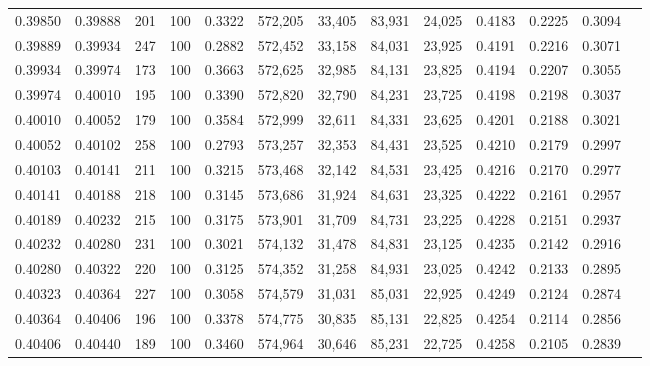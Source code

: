 \begin{tabular}{rrrrrrrrrrrrr}
0.39850 & 0.39888 &   201 & 100 &                                     0.3322 & 572,205 &  33,405 &  83,931 &  24,025 & 0.4183 & 0.2225 & 0.3094 \\
0.39889 & 0.39934 &   247 & 100 &                                     0.2882 & 572,452 &  33,158 &  84,031 &  23,925 & 0.4191 & 0.2216 & 0.3071 \\
0.39934 & 0.39974 &   173 & 100 &                                     0.3663 & 572,625 &  32,985 &  84,131 &  23,825 & 0.4194 & 0.2207 & 0.3055 \\
0.39974 & 0.40010 &   195 & 100 &                                     0.3390 & 572,820 &  32,790 &  84,231 &  23,725 & 0.4198 & 0.2198 & 0.3037 \\
0.40010 & 0.40052 &   179 & 100 &                                     0.3584 & 572,999 &  32,611 &  84,331 &  23,625 & 0.4201 & 0.2188 & 0.3021 \\
0.40052 & 0.40102 &   258 & 100 &                                     0.2793 & 573,257 &  32,353 &  84,431 &  23,525 & 0.4210 & 0.2179 & 0.2997 \\
0.40103 & 0.40141 &   211 & 100 &                                     0.3215 & 573,468 &  32,142 &  84,531 &  23,425 & 0.4216 & 0.2170 & 0.2977 \\
0.40141 & 0.40188 &   218 & 100 &                                     0.3145 & 573,686 &  31,924 &  84,631 &  23,325 & 0.4222 & 0.2161 & 0.2957 \\
0.40189 & 0.40232 &   215 & 100 &                                     0.3175 & 573,901 &  31,709 &  84,731 &  23,225 & 0.4228 & 0.2151 & 0.2937 \\
0.40232 & 0.40280 &   231 & 100 &                                     0.3021 & 574,132 &  31,478 &  84,831 &  23,125 & 0.4235 & 0.2142 & 0.2916 \\
0.40280 & 0.40322 &   220 & 100 &                                     0.3125 & 574,352 &  31,258 &  84,931 &  23,025 & 0.4242 & 0.2133 & 0.2895 \\
0.40323 & 0.40364 &   227 & 100 &                                     0.3058 & 574,579 &  31,031 &  85,031 &  22,925 & 0.4249 & 0.2124 & 0.2874 \\
0.40364 & 0.40406 &   196 & 100 &                                     0.3378 & 574,775 &  30,835 &  85,131 &  22,825 & 0.4254 & 0.2114 & 0.2856 \\
0.40406 & 0.40440 &   189 & 100 &                                     0.3460 & 574,964 &  30,646 &  85,231 &  22,725 & 0.4258 & 0.2105 & 0.2839 \\

\end{tabular}
